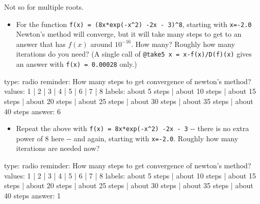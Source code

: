 \documentclass[12pt]{article}
\begin{document}
Not so for multiple roots.

\begin{itemize}
\itemsep1pt\parskip0pt
\item
  For the function \texttt{f(x) = (8x*exp(-x\^{}2) -2x - 3)\^{}8},
  starting with \texttt{x=-2.0} Newton's method will converge, but it
  will take many steps to get to an answer that has $f(x)$ around
  $10^{-16}$. How many? Roughly how many iterations do you need? (A
  single call of \texttt{@take5 x = x-f(x)/D(f)(x)} gives an answer with
  \texttt{f(x) = 0.00028} only.)
\end{itemize}

\begin{answer}
type: radio
reminder: How many steps to get convergence of newton's method?
values: 1 | 2 | 3 | 4 | 5 | 6 | 7 | 8
labels: about 5 steps | about 10 steps | about 15 steps | about 20 steps | about 25 steps | about 30 steps | about 35 steps | about 40 steps
answer: 6
\end{answer}

\begin{itemize}
\itemsep1pt\parskip0pt
\item
  Repeat the above with \texttt{f(x) = 8x*exp(-x\^{}2) -2x - 3} -{}-
  there is no extra power of $8$ here -{}- and again, starting with
  \texttt{x=-2.0}. Roughly how many iterations are needed now?
\end{itemize}

\begin{answer}
type: radio
reminder: How many steps to get convergence of newton's method?
values: 1 | 2 | 3 | 4 | 5 | 6 | 7 | 8
labels: about 5 steps | about 10 steps | about 15 steps | about 20 steps | about 25 steps | about 30 steps | about 35 steps | about 40 steps
answer: 1
\end{answer}
\end{document}
